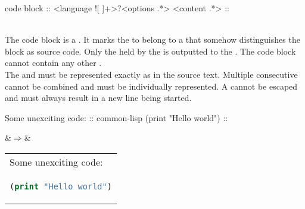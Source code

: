 \begin{identifier}{code block}
:: <language ![ ]+>?<options .*>
<content .*>
::
\end{identifier}
 \\

The code block is a . It marks the  to belong to a  that somehow distinguishes the block as source code. Only the  held by the  is outputted to the . The code block  cannot contain any other . \\

The  and  must be represented exactly as in the source text. Multiple consecutive   cannot be combined and must be individually represented. A   cannot be escaped and must always result in a new line being started. \\

\begin{examples}
\begin{examplesource}
Some unexciting code:
:: common-lisp
(print "Hello world")
::
\end{examplesource}
  &$\Rightarrow$&
  \begin{tabular}{@{}l@{}}
Some unexciting code: \\
\begin{lstlisting}[style=codestyle,language=Lisp,showstringspaces=false]
(print "Hello world")
\end{lstlisting}
\end{tabular}
\end{examples}

